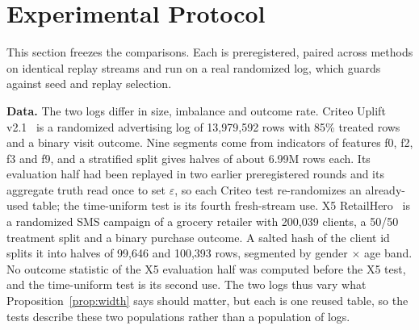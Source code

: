 \documentclass[sigconf,anonymous,review]{acmart}
\newcommand{\eps}{\varepsilon}
\begin{document}
\section{Experimental Protocol}\label{sec:protocol}

This section freezes the comparisons. Each is preregistered, paired across methods on identical replay streams and run on a real randomized log, which guards against seed and replay selection.

\textbf{Data.} The two logs differ in size, imbalance and outcome rate. Criteo Uplift v2.1~\citep{diemert2018large} is a randomized advertising log of 13,979,592 rows with 85\% treated rows and a binary visit outcome. Nine segments come from indicators of features f0, f2, f3 and f9, and a stratified split gives halves of about 6.99M rows each. Its evaluation half had been replayed in two earlier preregistered rounds and its aggregate truth read once to set $\eps$, so each Criteo test re-randomizes an already-used table; the time-uniform test is its fourth fresh-stream use. X5 RetailHero~\citep{x5retailhero2019} is a randomized SMS campaign of a grocery retailer with 200,039 clients, a 50/50 treatment split and a binary purchase outcome. A salted hash of the client id splits it into halves of 99,646 and 100,393 rows, segmented by gender $\times$ age band. No outcome statistic of the X5 evaluation half was computed before the X5 test, and the time-uniform test is its second use. The two logs thus vary what Proposition~\ref{prop:width} says should matter, but each is one reused table, so the tests describe these two populations rather than a population of logs.
\end{document}
